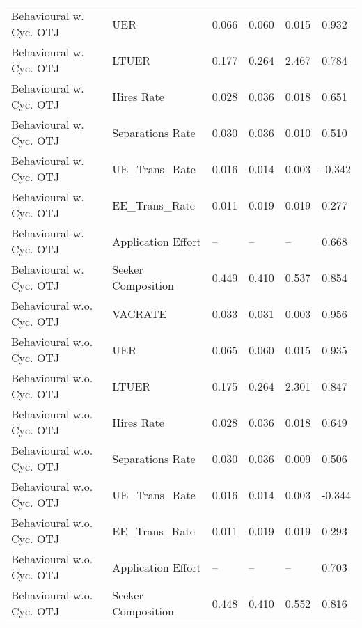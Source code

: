 \begin{table}[ht]
\begin{adjustbox}{width=\textwidth}
\begin{tabular}{llllll}
Behavioural w. Cyc. OTJ & UER & 0.066 & 0.060 & \cellcolor{yellow!25}0.015 & 0.932 \\
Behavioural w. Cyc. OTJ & LTUER & 0.177 & 0.264 & 2.467 & 0.784 \\
Behavioural w. Cyc. OTJ & Hires Rate & 0.028 & 0.036 & 0.018 & \cellcolor{yellow!25}0.651 \\
Behavioural w. Cyc. OTJ & Separations Rate & 0.030 & 0.036 & 0.010 & \cellcolor{yellow!25}0.510 \\
Behavioural w. Cyc. OTJ & UE_Trans_Rate & \cellcolor{yellow!25}0.016 & 0.014 & \cellcolor{yellow!25}0.003 & \cellcolor{yellow!25}-0.342 \\
Behavioural w. Cyc. OTJ & EE_Trans_Rate & \cellcolor{yellow!25}0.011 & 0.019 & \cellcolor{yellow!25}0.019 & 0.277 \\
Behavioural w. Cyc. OTJ & Application Effort & -- & -- & -- & 0.668 \\
Behavioural w. Cyc. OTJ & Seeker Composition & 0.449 & 0.410 & 0.537 & 0.854 \\
Behavioural w.o. Cyc. OTJ & VACRATE & 0.033 & 0.031 & 0.003 & 0.956 \\
Behavioural w.o. Cyc. OTJ & UER & 0.065 & 0.060 & 0.015 & 0.935 \\
Behavioural w.o. Cyc. OTJ & LTUER & 0.175 & 0.264 & \cellcolor{yellow!25}2.301 & \cellcolor{yellow!25}0.847 \\
Behavioural w.o. Cyc. OTJ & Hires Rate & 0.028 & 0.036 & 0.018 & 0.649 \\
Behavioural w.o. Cyc. OTJ & Separations Rate & 0.030 & 0.036 & 0.009 & 0.506 \\
Behavioural w.o. Cyc. OTJ & UE_Trans_Rate & 0.016 & 0.014 & 0.003 & -0.344 \\
Behavioural w.o. Cyc. OTJ & EE_Trans_Rate & 0.011 & 0.019 & 0.019 & \cellcolor{yellow!25}0.293 \\
Behavioural w.o. Cyc. OTJ & Application Effort & -- & -- & -- & \cellcolor{yellow!25}0.703 \\
Behavioural w.o. Cyc. OTJ & Seeker Composition & 0.448 & 0.410 & 0.552 & 0.816 \\
\bottomrule
\end{tabular}
\end{adjustbox}
\end{table}
